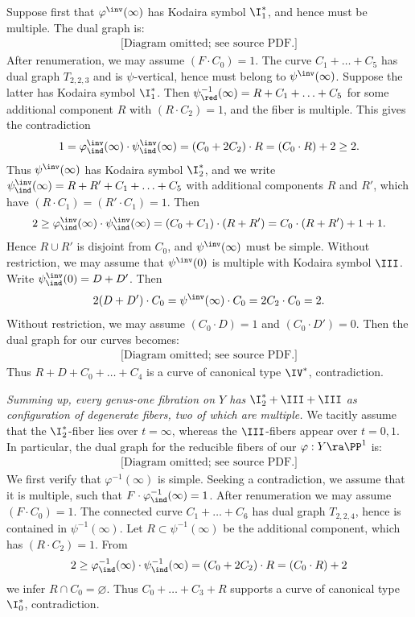 Suppose first that $\varphi^\inv(\infty)$ has Kodaira symbol $\I_1^*$, and hence must be multiple. The dual graph is:
\begin{equation*}
\begin{gathered}
\text{[Diagram omitted; see source PDF.]}
\end{gathered}
\end{equation*}
After renumeration, we may assume $(F\cdot C_0)=1$. The curve $C_1+\ldots +C_5$ has dual graph
$T_{2,2,3}$ and is $\psi$-vertical, hence must belong to $\psi^\inv(\infty)$. Suppose the latter has Kodaira symbol
$\I_1^*$. Then $\psi^{-1}_\red(\infty)=R+C_1+\ldots+C_5$ for some additional component
$R$ with $(R\cdot C_2)=1$, and the fiber is multiple. This gives the contradiction
$$
1=\varphi^\inv_\ind(\infty)\cdot\psi^\inv_\ind(\infty) = (C_0+2C_2)\cdot R = (C_0\cdot R) + 2\geq 2.
$$
Thus $\psi^\inv(\infty)$ has Kodaira symbol $\I_2^*$, and we write $\psi^\inv_\ind(\infty)=R+R'+C_1+\ldots+C_5$
with additional components $R$ and $R'$, which have  $(R\cdot C_1)=(R'\cdot C_1)=1$. Then
$$
2\geq \varphi^\inv_\ind(\infty)\cdot\psi^\inv_\ind(\infty) = (C_0+C_1)\cdot (R+R') = C_0\cdot(R+R')  + 1+1.
$$
Hence $R\cup R'$ is disjoint from $C_0$, and $\psi^\inv(\infty)$ must be simple.
Without restriction, we may assume that $\psi^\inv(0)$ is multiple with Kodaira symbol $\III$.
Write $\psi^\inv_\ind(0)=D+D'$. Then
$$
2(D+D')\cdot C_0=\psi^\inv(\infty)\cdot C_0 =2C_2\cdot C_0 = 2.
$$
Without restriction, we may assume $(C_0\cdot D)=1$ and $(C_0\cdot D')=0$.
Then the dual graph for our curves becomes:
\begin{equation*}
\begin{gathered}
\text{[Diagram omitted; see source PDF.]}
\end{gathered}
\end{equation*}
Thus $R+D+C_0+\ldots+C_4$ is a curve of canonical type $\IV^*$, contradiction.

\emph{ Summing up, every  genus-one fibration on $Y$
 has   $\I_2^*+\III+\III$ as configuration of degenerate fibers, two of which are multiple.}
We tacitly assume that  the $\I_2^*$-fiber lies over $t=\infty$, whereas the
$\III$-fibers appear over $t=0,1$.
In particular,  the  dual graph for the reducible fibers of our $\varphi:Y\ra\PP^1$ is:
\begin{equation*}
\begin{gathered}
\text{[Diagram omitted; see source PDF.]}
\end{gathered}
\end{equation*}
We first verify that $\varphi^{-1}(\infty)$ is simple. Seeking a contradiction, we assume that it is multiple,
such that $F\cdot \varphi^{-1}_\ind(\infty)=1$. After renumeration  we may assume $(F\cdot C_0)=1$.
The connected curve $C_1+\ldots+C_6$ has dual graph $T_{2,2,4}$, hence is contained in $\psi^{-1}(\infty)$.
Let $R\subset\psi^{-1}(\infty)$ be the additional component, which has $(R\cdot C_2)=1$.
From
$$
2\geq \varphi^{-1}_\ind(\infty)\cdot \psi^{-1}_\ind(\infty) = (C_0+2C_2)\cdot R = (C_0\cdot R) + 2
$$
we infer $R\cap C_0=\varnothing$. Thus $C_0+\ldots +C_3+R$ supports a curve of canonical type $\I_0^*$,
contradiction.

